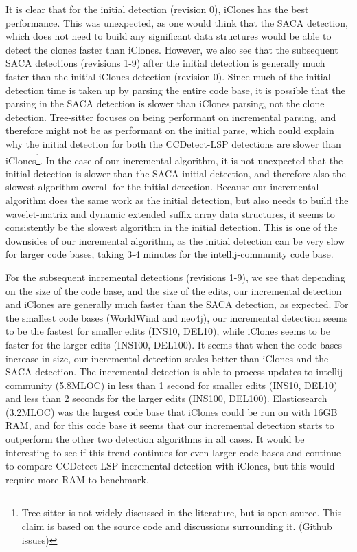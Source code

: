 It is clear that for the initial detection (revision 0), iClones has the best performance.
This was unexpected, as one would think that the SACA detection, which does not need to
build any significant data structures would be able to detect the clones faster than
iClones. However, we also see that the subsequent SACA detections (revisions 1-9) after
the initial detection is generally much faster than the initial iClones detection
(revision 0). Since much of the initial detection time is taken up by parsing the entire
code base, it is possible that the parsing in the SACA detection is slower than iClones
parsing, not the clone detection. Tree-sitter focuses on being performant on incremental
parsing, and therefore might not be as performant on the initial parse, which could
explain why the initial detection for both the CCDetect-LSP detections are slower than
iClones\footnote{Tree-sitter is not widely discussed in the literature, but is
open-source. This claim is based on the source code and discussions surrounding it.
(Github issues)}. In the case of our incremental algorithm, it is not unexpected that the
initial detection is slower than the SACA initial detection, and therefore also the
slowest algorithm overall for the initial detection. Because our incremental algorithm
does the same work as the initial detection, but also needs to build the wavelet-matrix
and dynamic extended suffix array data structures, it seems to consistently be the slowest
algorithm in the initial detection. This is one of the downsides of our incremental
algorithm, as the initial detection can be very slow for larger code bases, taking 3-4
minutes for the intellij-community code base.

For the subsequent incremental detections (revisions 1-9), we see that depending on the
size of the code base, and the size of the edits, our incremental detection and iClones
are generally much faster than the SACA detection, as expected. For the smallest code
bases (WorldWind and neo4j), our incremental detection seems to be the fastest for smaller
edits (INS10, DEL10), while iClones seems to be faster for the larger edits (INS100,
DEL100). It seems that when the code bases increase in size, our incremental detection
scales better than iClones and the SACA detection. The incremental detection is able to
process updates to intellij-community (5.8MLOC) in less than 1 second for smaller edits
(INS10, DEL10) and less than 2 seconds for the larger edits (INS100, DEL100).
Elasticsearch (3.2MLOC) was the largest code base that iClones could be run on with 16GB
RAM, and for this code base it seems that our incremental detection starts to outperform
the other two detection algorithms in all cases. It would be interesting to see if this
trend continues for even larger code bases and continue to compare CCDetect-LSP
incremental detection with iClones, but this would require more RAM to benchmark.

